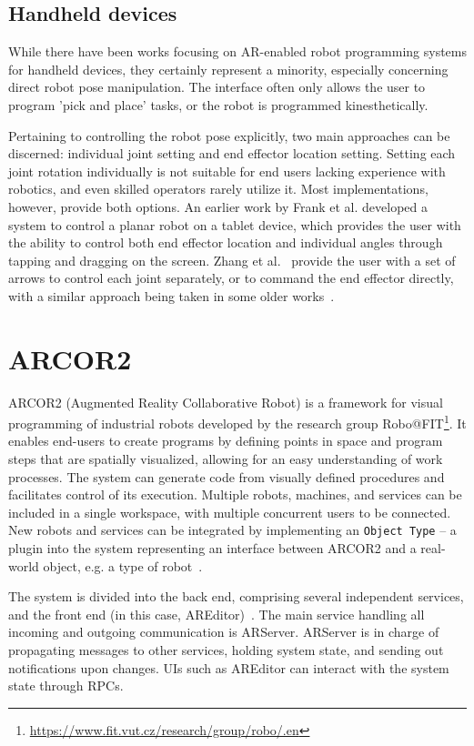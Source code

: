 \section{Handheld devices}

While there have been works focusing on AR-enabled robot programming systems for handheld devices, they certainly represent a minority, especially concerning direct robot pose manipulation. The interface often only allows the user to program 'pick and place' tasks, or the robot is programmed kinesthetically\cite{picknplace, Tango}.

Pertaining to controlling the robot pose explicitly, two main approaches can be discerned: individual joint setting and end effector location setting. Setting each joint rotation individually is not suitable for end users lacking experience with robotics, and even skilled operators rarely utilize it. Most implementations, however, provide both options. An earlier work by Frank et al.\cite{planar} developed a system to control a planar robot on a tablet device, which provides the user with the ability to control both end effector location and individual angles through tapping and dragging on the screen. Zhang et al.~\cite{ZHANG20201221} provide the user with a set of arrows to control each joint separately, or to command the end effector directly, with a similar approach being taken in some older works~\cite{pendant}. 



\chapter{ARCOR2}
ARCOR2 (Augmented Reality Collaborative Robot) is a framework for visual programming of industrial robots developed by the research group Robo@FIT\footnote{\url{https://www.fit.vut.cz/research/group/robo/.en}}. It enables end-users to create programs by defining points in space and program steps that are spatially visualized, allowing for an easy understanding of work processes. The system can generate code from visually defined procedures and facilitates control of its execution. Multiple robots, machines, and services can be included in a single workspace, with multiple concurrent users to be connected. New robots and services can be integrated by implementing an \texttt{Object Type} -- a plugin into the system representing an interface between ARCOR2 and a real-world object, e.g. a type of robot~\cite{kapinus2023arcor2}.

The system is divided into the back end, comprising several independent services, and the front end (in this case, AREditor)~\cite{arcor2}. The main service handling all incoming and outgoing communication is ARServer. ARServer is in charge of propagating messages to other services, holding system state, and sending out notifications upon changes. UIs such as AREditor can interact with the system state through RPCs.

